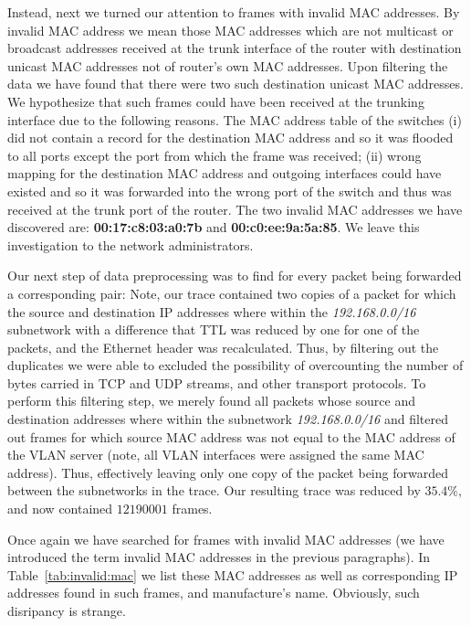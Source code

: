 Instead, next we turned our attention to frames with invalid MAC addresses. 
By invalid MAC address we mean those MAC addresses which are not multicast or 
broadcast addresses received at the trunk interface of the router with 
destination unicast MAC addresses not of router's own MAC addresses. 
Upon filtering the data we have found that there were two such 
destination unicast MAC addresses. We hypothesize that such frames could have been
received at the trunking interface due to the following reasons. The MAC
address table of the switches (i) did not contain a record for the destination 
MAC address and so it was flooded to all ports except the port from which 
the frame was received; (ii) wrong mapping for the destination MAC 
address and outgoing interfaces could have existed and so it was 
forwarded into the wrong port of the switch and thus was received at the 
trunk port of the router. The two invalid MAC addresses we have discovered are: 
{\bf 00:17:c8:03:a0:7b} and {\bf 00:c0:ee:9a:5a:85}. We leave this 
investigation to the network administrators.


Our next step of data preprocessing was to find for every packet being 
forwarded a corresponding pair: Note, our trace contained two copies 
of a packet for which the source and destination IP addresses where within 
the {\em 192.168.0.0/16} subnetwork with a difference that TTL was reduced 
by one for one of the packets, and the Ethernet header was recalculated. 
Thus, by filtering out the duplicates we were able to excluded the 
possibility of overcounting the number of bytes carried in TCP and 
UDP streams, and other transport protocols. To perform this filtering step, 
we merely found all packets whose source and destination addresses where within 
the subnetwork {\em 192.168.0.0/16} and filtered out frames for which 
source MAC address was not equal to the MAC address of the VLAN server
(note, all VLAN interfaces were assigned the same MAC address). 
Thus, effectively leaving only one copy of the packet being forwarded 
between the subnetworks in the trace. Our resulting trace was reduced by
$35.4 \%$, and now contained $12190001$ frames.

Once again we have searched for frames with invalid MAC
addresses (we have introduced the term invalid MAC addresses in the
previous paragraphs). In Table~\ref{tab:invalid:mac} we list these
MAC addresses as well as corresponding IP addresses found in such
frames, and manufacture's name. Obviously, such disripancy is strange.


